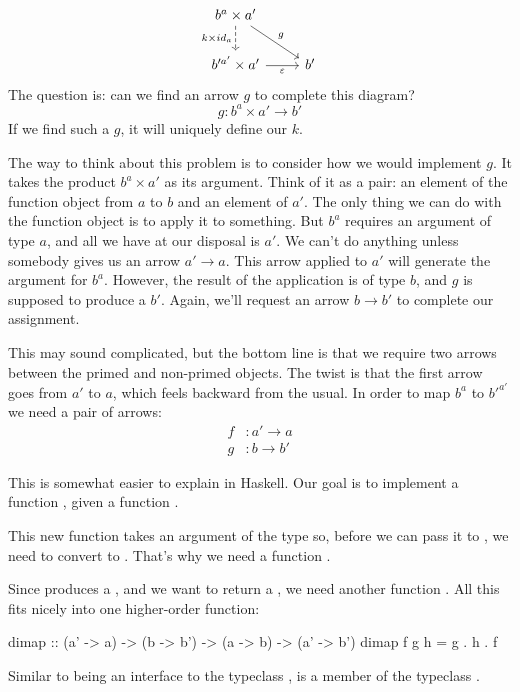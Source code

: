 \documentclass[DaoFP]{subfiles}
\begin{document}
\[
 \begin{tikzcd}
 b^a \times a'
 \arrow[d, dashed, "k \times id_a"']
 \arrow[rd, "g"]
 \\
 b'^{a'} \times a'
 \arrow[r, "\varepsilon"']
& b'
 \end{tikzcd}
\]
The question is: can we find an arrow $g$ to complete this diagram? 
\[g \colon b^a \times a' \to b'\]
If we find such a $g$, it will uniquely define our $k$.

The way to think about this problem is to consider how we would implement $g$. It takes the product $b^a \times a'$ as its argument. Think of it as a pair: an element of the function object from $a$ to $b$ and an element of $a'$. The only thing we can do with the function object is to apply it to something. But $b^a$ requires an argument of type $a$, and all we have at our disposal is $a'$. We can't do anything unless somebody gives us an arrow $a' \to a$. This arrow applied to $a'$ will generate the argument for $b^a$. However, the result of the application is of type $b$, and $g$ is supposed to produce a $b'$. Again, we'll request an arrow $b \to b'$ to complete our assignment. 

This may sound complicated, but the bottom line is that we require two arrows between the primed and non-primed objects. The twist is that the first arrow goes from $a'$ to $a$, which feels backward from the usual. In order to map $b^a$ to $b'^{a'}$ we need a pair of arrows:
\begin{align*}
f &\colon a' \to a \\
g &\colon b \to b' 
\end{align*}

This is somewhat easier to explain in Haskell. Our goal is to implement a function , given a function . 

This new function takes an argument of the type  so, before we can pass it to , we need to convert  to . That's why we need a function . 

Since  produces a , and we want to return a , we need another function . All this fits nicely into one higher-order function:
\begin{haskell}
dimap :: (a' -> a) -> (b -> b') -> (a -> b) -> (a' -> b')
dimap f g h = g . h . f
\end{haskell}
Similar to  being an interface to the typeclass ,  is a member of the typeclass .
\end{document}
